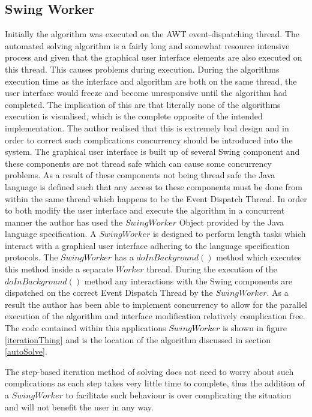 \subsection{Swing Worker}
\label{swingmeupm8}
Initially the algorithm was executed on the AWT event-dispatching thread. The automated solving algorithm is a fairly long and somewhat resource intensive process and given that the graphical user interface elements are also executed on this thread. This causes problems during execution. During the algorithms execution time as the interface and algorithm are both on the same thread, the user interface would freeze and become unresponsive until the algorithm had completed. The implication of this are that literally none of the algorithms execution is visualised, which is the complete opposite of the intended implementation. The author realised that this is extremely bad design and in order to correct such complications concurrency should be introduced into the system. The graphical user interface is built up of several Swing component and these components are not thread safe which can cause some concurrency problems. As a result of these components not being thread safe the Java language is defined such that any access to these components must be done from within the same thread which happens to be the Event Dispatch Thread. In order to both modify the user interface and execute the algorithm in a concurrent manner the author has used the $SwingWorker$ Object provided by the Java language specification. A $SwingWorker$ is designed to perform length tasks which interact with a graphical user interface adhering to the language specification protocols. The $SwingWorker$ has a $doInBackground()$ method which executes this method inside a separate $Worker$ thread. During the execution of the $doInBackground()$ method any interactions with the Swing components are dispatched on the correct Event Dispatch Thread by the $SwingWorker$. As a result the author has been able to implement concurrency to allow for the parallel execution of the algorithm and interface modification relatively complication free. The code contained within this applications $SwingWorker$ is shown in figure \ref{iterationThing} and is the location of the algorithm discussed in section \ref{autoSolve}. 

The step-based iteration method of solving does not need to worry about such complications as each step takes very little time to complete, thus the addition of a $SwingWorker$ to facilitate such behaviour is over complicating the situation and will not benefit the user in any way.


